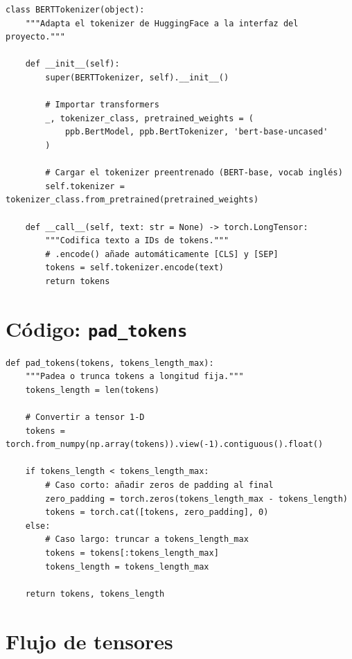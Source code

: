 \begin{verbatim}
class BERTTokenizer(object):
    """Adapta el tokenizer de HuggingFace a la interfaz del proyecto."""

    def __init__(self):
        super(BERTTokenizer, self).__init__()

        # Importar transformers
        _, tokenizer_class, pretrained_weights = (
            ppb.BertModel, ppb.BertTokenizer, 'bert-base-uncased'
        )

        # Cargar el tokenizer preentrenado (BERT-base, vocab inglés)
        self.tokenizer = tokenizer_class.from_pretrained(pretrained_weights)

    def __call__(self, text: str = None) -> torch.LongTensor:
        """Codifica texto a IDs de tokens."""
        # .encode() añade automáticamente [CLS] y [SEP]
        tokens = self.tokenizer.encode(text)
        return tokens
\end{verbatim}

\section{Código: \texttt{pad\_tokens}}

\begin{verbatim}
def pad_tokens(tokens, tokens_length_max):
    """Padea o trunca tokens a longitud fija."""
    tokens_length = len(tokens)

    # Convertir a tensor 1-D
    tokens = torch.from_numpy(np.array(tokens)).view(-1).contiguous().float()

    if tokens_length < tokens_length_max:
        # Caso corto: añadir zeros de padding al final
        zero_padding = torch.zeros(tokens_length_max - tokens_length)
        tokens = torch.cat([tokens, zero_padding], 0)
    else:
        # Caso largo: truncar a tokens_length_max
        tokens = tokens[:tokens_length_max]
        tokens_length = tokens_length_max

    return tokens, tokens_length
\end{verbatim}

\section{Flujo de tensores}

